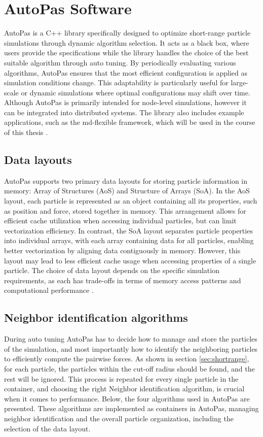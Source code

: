 \section{AutoPas Software}

AutoPas is a C++ library specifically designed to optimize short-range particle simulations through dynamic algorithm selection. It acts as a black box, where users provide the specifications while the library handles the choice of the best suitable algorithm through auto tuning. By periodically evaluating various algorithms, AutoPas ensures that the most efficient configuration is applied as simulation conditions change. This adaptability is particularly useful for large-scale or dynamic simulations where optimal configurations may shift over time. Although AutoPas is primarily intended for node-level simulations, however it can be integrated into distributed systems. The library also includes example applications, such as the md-flexible framework, which will be used in the course of this thesis \parencite{gratl2019autopas}.


\subsection{Data layouts}

AutoPas supports two primary data layouts for storing particle information in memory: Array of Structures (AoS) and Structure of Arrays (SoA). In the AoS layout, each particle is represented as an object containing all its properties, such as position and force, stored together in memory. This arrangement allows for efficient cache utilization when accessing individual particles, but can limit vectorization efficiency. In contrast, the SoA layout separates particle properties into individual arrays, with each array containing data for all particles, enabling better vectorization by aligning data contiguously in memory. However, this layout may lead to less efficient cache usage when accessing properties of a single particle. The choice of data layout depends on the specific simulation requirements, as each has trade-offs in terms of memory access patterns and computational performance \parencite{gratl2019autopas}.

\subsection{Neighbor identification algorithms} \label{sec:neighbor_iden_algs}

During auto tuning AutoPas has to decide how to manage and store the particles of the simulation, and most importantly how to identify the neighboring particles to efficiently compute the pairwise forces. As shown in section \ref{sec:shortrange}, for each particle, the particles within the cut-off radius should be found, and the rest will be ignored. This process is repeated for every single particle in the container, and choosing the right Neighbor identification algorithm, is crucial when it comes to performance. Below, the four algorithms used in AutoPas are presented. These algorithms are implemented as containers in AutoPas, managing neighbor identification and the overall particle organization, including the selection of the data layout. 

